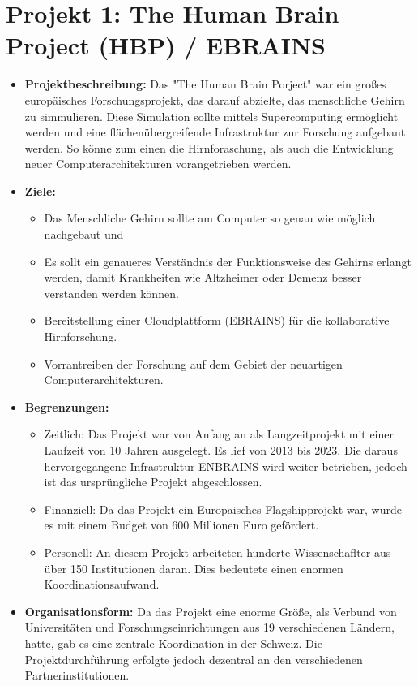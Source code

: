 \documentclass{article}
\begin{document}
\section{Projekt 1: The Human Brain Project (HBP) / EBRAINS}
\begin{itemize}
    \item \textbf{Projektbeschreibung:} 
    Das "The Human Brain Porject" war ein großes europäisches Forschungsprojekt, das darauf abzielte, 
    das menschliche Gehirn zu simmulieren. Diese Simulation sollte mittels Supercomputing ermöglicht 
    werden und eine flächenübergreifende Infrastruktur zur Forschung aufgebaut werden. 
    So könne zum einen die Hirnforaschung, als auch die Entwicklung neuer Computerarchitekturen 
    vorangetrieben werden.

    \item \textbf{Ziele:}
    \begin{itemize}
        \item Das Menschliche Gehirn sollte am Computer so genau wie möglich nachgebaut und
        \item Es sollt ein genaueres Verständnis der Funktionsweise des Gehirns erlangt 
        werden, damit Krankheiten wie Altzheimer oder Demenz besser verstanden werden können.
        \item Bereitstellung einer Cloudplattform (EBRAINS) für die kollaborative 
        Hirnforschung.
        \item Vorrantreiben der Forschung auf dem Gebiet der neuartigen Computerarchitekturen.
    \end{itemize}

    \item \textbf{Begrenzungen:}
    \begin{itemize}
        \item Zeitlich: Das Projekt war von Anfang an als Langzeitprojekt mit einer Laufzeit von 10 Jahren ausgelegt.
        Es lief von 2013 bis 2023. Die daraus hervorgegangene Infrastruktur ENBRAINS wird weiter betrieben, jedoch ist das ursprüngliche Projekt abgeschlossen.
        \item Finanziell: Da das Projekt ein Europaisches Flagshipprojekt war, wurde es mit einem Budget von 600 Millionen Euro gefördert.
        \item Personell: An diesem Projekt arbeiteten hunderte Wissenschaflter aus über 150 Institutionen daran. Dies bedeutete einen enormen Koordinationsaufwand.
    \end{itemize}

    \item \textbf{Organisationsform:}
    Da das Projekt eine enorme Größe, als Verbund von Universitäten und Forschungseinrichtungen aus 19 verschiedenen Ländern, hatte, gab es eine zentrale 
    Koordination in der Schweiz. Die Projektdurchführung erfolgte jedoch dezentral an den verschiedenen Partnerinstitutionen.
\end{itemize}
\end{document}
